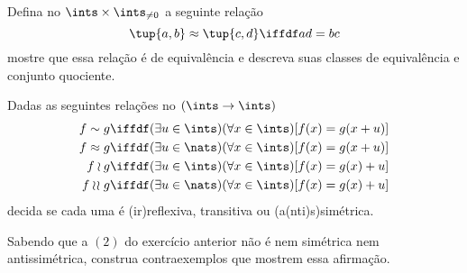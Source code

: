 \begin{exercise}
    Defina no $\ints \times \ints_{\neq 0}$ a seguinte relação
    $$
    \tup{a,b} \approx \tup{c,d} \iffdf ad = bc
    $$
    mostre que essa relação é de equivalência e descreva suas classes de
    equivalência e conjunto quociente.
\end{exercise}

\begin{exercise}
    Dadas as seguintes relações no $(\ints \to \ints)$
    \begin{align}
      f \sim g    &\iffdf
                  (\exists u \in \ints)(\forall x \in \ints)[f(x) = g(x + u)] \\
      f \approx g &\iffdf
                  (\exists u \in \nats)(\forall x \in \ints)[f(x) = g(x + u)] \\
      f \wr g     &\iffdf
                  (\exists u \in \ints)(\forall x \in \ints)[f(x) = g(x) + u] \\
      f \wr\!\wr\; g &\iffdf
                  (\exists u \in \nats)(\forall x \in \ints)[f(x) = g(x) + u]
    \end{align}
    decida se cada uma é (ir)reflexiva, transitiva ou (a(nti)s)simétrica.
\end{exercise}

\begin{homework}
    Sabendo que a $(2)$ do exercício anterior não é nem simétrica nem
    antissimétrica, construa contraexemplos que mostrem essa afirmação.
\end{homework}